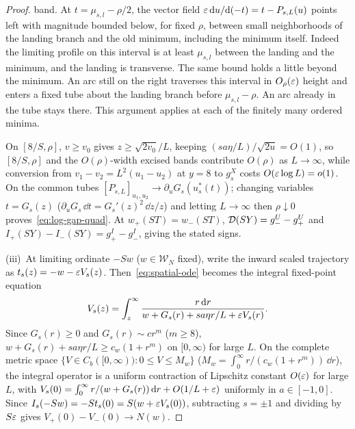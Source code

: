 \begin{proof}
band. At $t=\mu_{s,l}-\rho/2$,
the vector field $\varepsilon\,\mathrm{d} u/\mathrm{d}(-t)=t-P_{s,L}(u)$ points left with
magnitude bounded below, for fixed $\rho$, between small neighborhoods
of the landing branch and the old minimum, including the minimum itself.
Indeed the limiting profile on this interval is at least $\mu_{s,l}$
between the landing and the minimum, and the landing is transverse.
The same bound holds a little beyond the minimum. An arc still on the
right traverses this interval in $O_\rho(\varepsilon)$ height and enters a
fixed tube about the landing branch before $\mu_{s,l}-\rho$. An arc
already in the tube stays there. This argument applies at each of the
finitely many ordered minima.

On $[8/S,\rho]$, $v\ge v_0$ gives $z\ge\sqrt{2v_0}/L$, keeping $(sa\eta/L)/\sqrt{2u}=O(1)$, so $[8/S,\rho]$ and the $O(\rho)$-width excised bands contribute $O(\rho)$ as $L\to\infty$, while conversion from $v_1-v_2=L^2(u_1-u_2)$ at $y=8$ to $g_s^X$ costs $O(\varepsilon\log L)=o(1)$. On the common tubes $[P_{s,L}]_{u_1,u_2}\to\partial_u G_s(u_s^*(t))$; changing variables $t=G_s(z)$ ($\partial_u G_s\,\dd t=G_s'(z)^2\,\dd z/z$) and letting $L\to\infty$ then $\rho\downarrow 0$ proves~\eqref{eq:log-gap-quad}. At $w_+(ST)=w_-(ST)$, $\mathcal{D}(SY)=g_-^U-g_+^U$ and $I_+(SY)-I_-(SY)=g_+^I-g_-^I$, giving the stated signs.

(iii)~At limiting ordinate $-Sw$ ($w\in\mathcal{W}_N$ fixed), write the inward scaled trajectory as $t_s(z)=-w-\varepsilon V_s(z)$. Then~\eqref{eq:spatial-ode} becomes the integral fixed-point equation
\[
  V_s(z) = \int_z^\infty \frac{r\,\mathrm{d} r}{w + G_s(r) + sa\eta r/L + \varepsilon V_s(r)}.
\]
Since $G_s(r)\ge 0$ and $G_s(r)\sim c r^m$ ($m\ge 8$), $w+G_s(r)+sa\eta r/L\ge c_w(1+r^m)$ on $[0,\infty)$ for large $L$. On the complete metric space $\{V\in C_b([0,\infty)):0\le V\le M_w\}$ ($M_w=\int_0^\infty r/(c_w(1+r^m))\,\dd r$), the integral operator is a uniform contraction of Lipschitz constant $O(\varepsilon)$ for large $L$, with $V_s(0)=\int_0^\infty r/(w+G_s(r))\,\mathrm{d} r+O(1/L+\varepsilon)$ uniformly in $a\in[-1,0]$. Since $I_s(-Sw)=-S t_s(0)=S(w+\varepsilon V_s(0))$, subtracting $s=\pm 1$ and dividing by $S\varepsilon$ gives $V_+(0)-V_-(0)\to N(w)$.
\end{proof}

